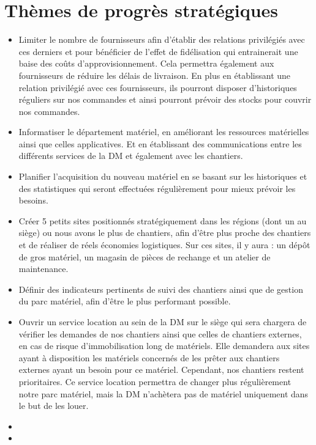 \section{Thèmes de progrès stratégiques}
        \begin{itemize}
                \item Limiter le nombre de fournisseurs afin d'établir des relations privilégiés avec ces derniers et pour bénéficier de l'effet de fidélisation qui entrainerait une baise des coûts d'approvisionnement. Cela permettra également aux fournisseurs de réduire les délais de livraison. En plus en établissant une relation privilégié avec ces fournisseurs, ils pourront disposer d'historiques réguliers sur nos commandes et ainsi pourront prévoir des stocks pour couvrir nos commandes.
                \item Informatiser le département matériel, en améliorant les ressources matérielles ainsi que celles applicatives. Et en établissant des communications entre les différents services de la DM et également avec les chantiers.
                \item Planifier l'acquisition du nouveau matériel en se basant sur les historiques et des statistiques qui seront effectuées régulièrement pour mieux prévoir les besoins.
                \item Créer 5 petits sites positionnés stratégiquement dans les régions (dont un au siège) ou nous avons le plus de chantiers, afin d'être plus proche des chantiers et de réaliser de réels économies logistiques. Sur ces sites, il y aura : un dépôt de gros matériel, un magasin de pièces de rechange et un atelier de maintenance.
                \item Définir des indicateurs pertinents de suivi des chantiers ainsi que de gestion du parc matériel, afin d'être le plus performant possible.
                \item Ouvrir un service location au sein de la DM sur le siège qui sera chargera de vérifier les demandes de nos chantiers ainsi que celles de chantiers externes, en cas de risque d'immobilisation long de matériels. Elle demandera aux sites ayant à disposition les matériels concernés de les prêter aux chantiers externes ayant un besoin pour ce matériel. Cependant, nos chantiers restent prioritaires. Ce service location permettra de changer plus régulièrement notre parc matériel, mais la DM n'achètera pas de matériel uniquement dans le but de les louer.
                \item 
                \item 
        \end{itemize}

